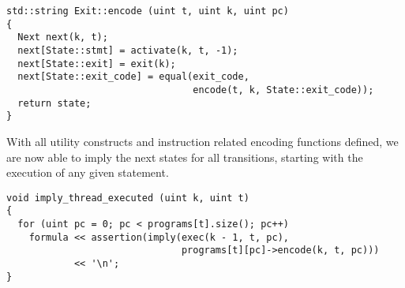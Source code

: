 
\begin{lstlisting}[style=c++, style=encode]
std::string Exit::encode (uint t, uint k, uint pc)
{
  Next next(k, t);
  next[State::stmt] = activate(k, t, -1);
  next[State::exit] = exit(k);
  next[State::exit_code] = equal(exit_code,
                                 encode(t, k, State::exit_code));
  return state;
}
\end{lstlisting}

\newpage




\noindent
With all utility constructs and instruction related encoding functions defined, we are now able to imply the next states for all transitions, starting with the execution of any given statement.

\begin{lstlisting}[style=c++]
void imply_thread_executed (uint k, uint t)
{
  for (uint pc = 0; pc < programs[t].size(); pc++)
    formula << assertion(imply(exec(k - 1, t, pc),
                               programs[t][pc]->encode(k, t, pc)))
            << '\n';
}
\end{lstlisting}

